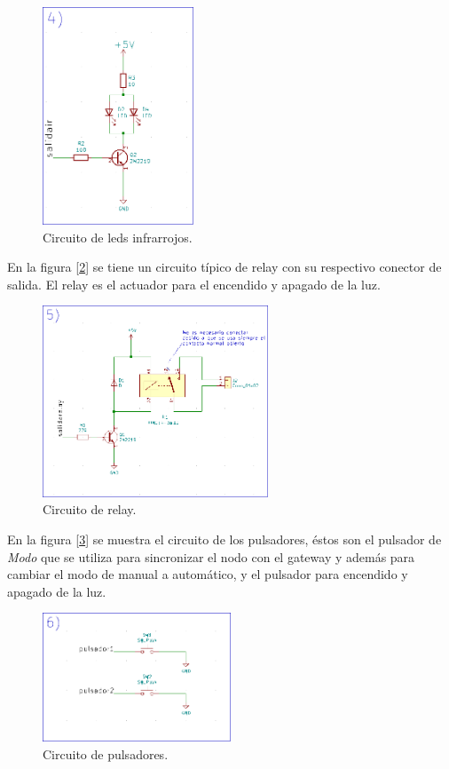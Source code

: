 \begin{figure}[h!]
	\centering
	\includegraphics[width=0.4\textwidth]{./Figures/esquematico4.png}
	\caption{Circuito de leds infrarrojos.}
	\label{fig:esquematico4}
\end{figure}

En la figura [\ref{fig:esquematico5}] se tiene un circuito típico de relay con su respectivo conector de salida. El relay es el actuador para el encendido y apagado de la luz.

\begin{figure}[h!]
	\centering
	\includegraphics[width=0.6\textwidth]{./Figures/esquematico5.png}
	\caption{Circuito de relay.}
	\label{fig:esquematico5}
\end{figure}

En la figura [\ref{fig:esquematico6}] se muestra el circuito de los pulsadores, éstos son el pulsador de {\textit{Modo}} que se utiliza para sincronizar el nodo con el gateway y además para cambiar el modo de manual a automático, y el pulsador para encendido y apagado de la luz.

\begin{figure}[h!]
	\centering
	\includegraphics[width=0.5\textwidth]{./Figures/esquematico6.png}
	\caption{Circuito de pulsadores.}
	\label{fig:esquematico6}
\end{figure}

